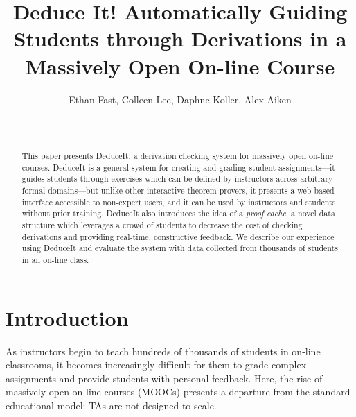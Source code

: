 \documentclass{sigchi}
\begin{document}
\title{Deduce It! Automatically Guiding Students through Derivations in a Massively Open On-line Course}

\author{
  \alignauthor Ethan Fast, Colleen Lee, Daphne Koller, Alex Aiken\\
    \\
    \\
}

\maketitle

\begin{abstract}
This paper presents DeduceIt, a derivation checking system for massively open on-line courses. DeduceIt is a general system for creating and grading student assignments---it guides students through exercises which can be defined by instructors across arbitrary formal domains---but unlike other interactive theorem provers, it presents a web-based interface accessible to non-expert users, and it can be used by instructors and students without prior training. DeduceIt also introduces the idea of a \textit{proof cache}, a novel data structure which leverages a crowd of students to decrease the cost of checking derivations and providing real-time, constructive feedback. We describe our experience using DeduceIt and evaluate the system with data collected from thousands of students in an on-line class.
\end{abstract}

\keywords{
	\textcolor{red}{What keywords to use?}
}





\section{Introduction}
As instructors begin to teach hundreds of thousands of students in on-line classrooms, it becomes increasingly difficult for them to grade complex assignments and provide students with personal feedback. Here, the rise of massively open on-line courses (MOOCs) presents a departure from the standard educational model: TAs are not designed to scale. 
\end{document}
